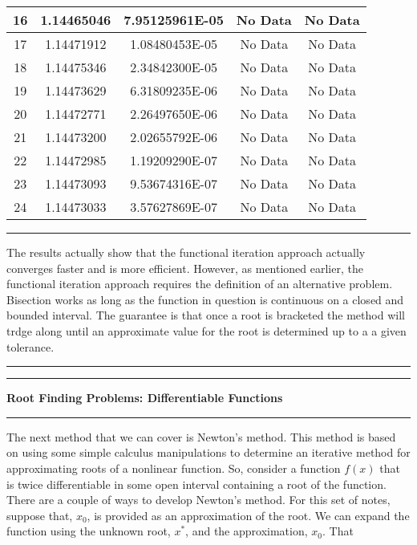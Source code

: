 \documentclass[10pt,fleqn]{article}
\begin{document}
\begin{table}[h]
\begin{center}
\begin{tabular}{|c||c|c||c|c|}
    \hline
      16 & 1.14465046 & 7.95125961E-05 & No Data & No Data \\
    \hline
      17 & 1.14471912 & 1.08480453E-05 & No Data & No Data \\
    \hline
      18 & 1.14475346 & 2.34842300E-05 & No Data & No Data \\
    \hline
      19 & 1.14473629 & 6.31809235E-06 & No Data & No Data \\
    \hline
      20 & 1.14472771 & 2.26497650E-06 & No Data & No Data \\
    \hline
      21 & 1.14473200 & 2.02655792E-06 & No Data & No Data \\
    \hline
      22 & 1.14472985 & 1.19209290E-07 & No Data & No Data \\
    \hline
      23 & 1.14473093 & 9.53674316E-07 & No Data & No Data \\
    \hline
      24 & 1.14473033 & 3.57627869E-07 & No Data & No Data \\
    \hline
  \end{tabular}
  \end{center}
\end{table}
\vskip0.1in\hrule\vskip0.1in
\noindent
The results actually show that the functional iteration approach actually
converges faster and is more efficient. However, as mentioned earlier, the 
functional iteration approach requires the definition of an alternative problem.
Bisection works as long as the function in question is continuous on a closed 
and bounded interval. The guarantee is that once a root is bracketed the method
will trdge along until an approximate value for the root is determined up to a
a given tolerance.
\vskip0.1in\hrule\vskip0.1in
\newpage
\vskip0.1in\hrule\vskip0.1in
\noindent
{\bf Root Finding Problems: Differentiable Functions}
\vskip0.1in\hrule\vskip0.1in
\noindent
The next method that we can cover is Newton's method. This method is based on
using some simple calculus manipulations to determine an iterative method for
approximating roots of a nonlinear function. So, consider a function $f(x)$ that
is twice differentiable in some open interval containing a root of the function.
There are a couple of ways to develop Newton's method. For this set of notes,
suppose that, $x_0$, is provided as an approximation of the root. We can expand
the function using the unknown root, $x^*$, and the approximation, $x_0$. That
\end{document}
